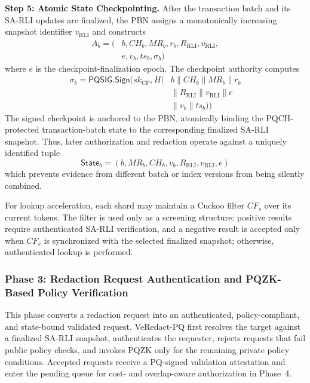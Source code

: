 \documentclass[lettersize,journal]{IEEEtran}
\begin{document}
\medskip
\noindent\textbf{Step 5: Atomic State Checkpointing.}
After the transaction batch and its SA-RLI updates are finalized, the
PBN assigns a monotonically increasing snapshot identifier
$v_{\mathrm{RLI}}$ and constructs
\begin{equation}
\begin{aligned}
A_b=\big(&b,CH_b,MR_b,r_b,R_{\mathrm{RLI}},
v_{\mathrm{RLI}},\\
& e,v_b,ts_b,\sigma_b\big)
\end{aligned}
\end{equation}
where $e$ is the checkpoint-finalization epoch. The checkpoint authority
computes
\begin{equation}
\begin{aligned}
\sigma_b=
\mathsf{PQSIG.Sign}\big(
sk_{\mathrm{CP}},
H(&b\parallel CH_b\parallel MR_b\parallel r_b\\
&\parallel R_{\mathrm{RLI}}\parallel v_{\mathrm{RLI}}
\parallel e\\
&\parallel v_b\parallel ts_b)\big)
\end{aligned}
\end{equation}
The signed checkpoint is anchored to the PBN, atomically binding the
PQCH-protected transaction-batch state to the corresponding finalized
SA-RLI snapshot. Thus, later authorization and redaction operate against
a uniquely identified tuple
\begin{equation}
\mathsf{State}_b=
(b,MR_b,CH_b,v_b,R_{\mathrm{RLI}},v_{\mathrm{RLI}},e)
\end{equation}
which prevents evidence from different batch or index versions from
being silently combined.

For lookup acceleration, each shard may maintain a Cuckoo filter
$CF_s$ over its current tokens. The filter is used only as a screening
structure: positive results require authenticated SA-RLI verification,
and a negative result is accepted only when $CF_s$ is synchronized with
the selected finalized snapshot; otherwise, authenticated lookup is
performed.    
    
   \subsubsection*{\textbf{Phase 3: Redaction Request Authentication and
PQZK-Based Policy Verification}}

This phase converts a redaction request into an authenticated,
policy-compliant, and state-bound validated request. VeRedact-PQ first
resolves the target against a finalized SA-RLI snapshot, authenticates
the requester, rejects requests that fail public policy checks, and
invokes PQZK only for the remaining private policy conditions. Accepted
requests receive a PQ-signed validation attestation and enter the pending
queue for cost- and overlap-aware authorization in Phase~4.
\end{document}
